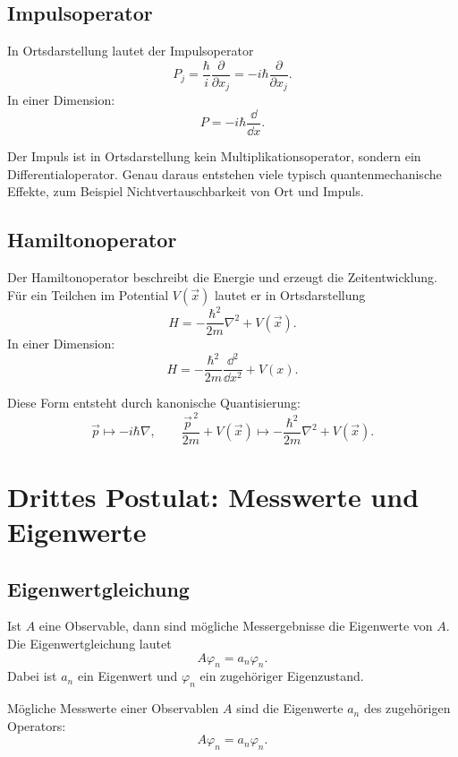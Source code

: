 \subsection{Impulsoperator}

In Ortsdarstellung lautet der Impulsoperator
\[
    P_j=\frac{\hbar}{i}\frac{\partial}{\partial x_j}
    =-i\hbar\frac{\partial}{\partial x_j}.
\]
In einer Dimension:
\[
    P=-i\hbar\frac{\dd}{\dd x}.
\]

\begin{conceptbox}
Der Impuls ist in Ortsdarstellung kein Multiplikationsoperator, sondern ein Differentialoperator. Genau daraus entstehen viele typisch quantenmechanische Effekte, zum Beispiel Nichtvertauschbarkeit von Ort und Impuls.
\end{conceptbox}

\subsection{Hamiltonoperator}

Der Hamiltonoperator beschreibt die Energie und erzeugt die Zeitentwicklung. Für ein Teilchen im Potential $V(\vec{x})$ lautet er in Ortsdarstellung
\[
    H=-\frac{\hbar^2}{2m}\nabla^2+V(\vec{x}).
\]
In einer Dimension:
\[
    H=-\frac{\hbar^2}{2m}\frac{\dd^2}{\dd x^2}+V(x).
\]

Diese Form entsteht durch kanonische Quantisierung:
\[
    \vec{p}\mapsto -i\hbar\nabla,
    \qquad
    \frac{\vec{p}^{\,2}}{2m}+V(\vec{x})
    \mapsto
    -\frac{\hbar^2}{2m}\nabla^2+V(\vec{x}).
\]

\section{Drittes Postulat: Messwerte und Eigenwerte}

\subsection{Eigenwertgleichung}

Ist $A$ eine Observable, dann sind mögliche Messergebnisse die Eigenwerte von $A$. Die Eigenwertgleichung lautet
\[
    A\varphi_n=a_n\varphi_n.
\]
Dabei ist $a_n$ ein Eigenwert und $\varphi_n$ ein zugehöriger Eigenzustand.

\begin{formulabox}
Mögliche Messwerte einer Observablen $A$ sind die Eigenwerte $a_n$ des zugehörigen Operators:
\[
    A\varphi_n=a_n\varphi_n.
\]
\end{formulabox}

